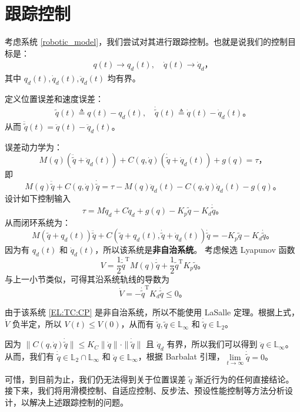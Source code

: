 \section{跟踪控制}\label{6Cref}

考虑系统 \eqref{robotic_model}，我们尝试对其进行跟踪控制。也就是说我们的控制目标是：
\begin{align*}
    q(t) \to q_d(t), \quad \dot{q}(t) \to \dot{q}_d \text{，}
\end{align*}
其中 $q_d(t), \dot{q}_d(t), \ddot{q}_d(t)$ 均有界。

定义位置误差和速度误差：
\begin{align*}
    \tilde{q}(t) \triangleq q(t) - q_d(t), \quad \dot{\tilde{q}}(t) \triangleq \dot{q}(t) - \dot{q}_d(t) \text{。}
\end{align*}
从而 $\ddot{\tilde{q}}(t) = \ddot{q}(t) - \ddot{q}_d(t)$。

误差动力学为：
\[
    M (q) (\ddot{\tilde{q}} + \ddot{q}_d(t)) + C (q, \dot{q}) (\dot{\tilde{q}} + \dot{q}_d(t)) + g(q) = \tau \text{，}
\]
即
\begin{equation}
    M (q) \ddot{\tilde{q}} + C (q, \dot{q}) \dot{\tilde{q}} = \tau - M(q) \ddot{q}_d(t) - C (q, \dot{q}) \dot{q}_d(t) - g(q) \text{。}
\end{equation}
设计如下控制输入
\[
    \tau = M \ddot{q}_d + C \dot{q}_d + g(q) - K_p \tilde{q} - K_d \dot{\tilde{q}} \text{。}
\]
从而闭环系统为：
\begin{equation} \label{EL:TC:CP}
    M (\tilde{q} + q_d (t)) \ddot{\tilde{q}} + C (\tilde{q} + q_d (t),
    \dot{\tilde{q}} + \dot{q}_d (t)) \dot{\tilde{q}} = - K_p \tilde{q} - K_d
    \dot{\tilde{q}} \text{。}
\end{equation}
因为有 $q_d(t)$ 和 $\dot{q}_d(t)$，所以该系统是\textbf{非自治系统}。
考虑候选 Lyapunov 函数
\[
    V = \frac{1}{2} \dot{\tilde{q}}^\mathrm{T} M(q) \dot{\tilde{q}} + \frac{1}{2} \tilde{q}^\mathrm{T} K_p \tilde{q} \text{。}
\]
与上一小节类似，可得其沿系统轨线的导数为
\[
    \dot{V} = - \dot{\tilde{q}}^\mathrm{T} K_d \dot{\tilde{q}} \leq 0 \text{。}
\]

由于该系统 \eqref{EL:TC:CP} 是非自治系统，所以不能使用 LaSalle 定理。根据上式，$\dot{V}$ 负半定，所以 $V(t) \leq V(0)$，从而有 $\dot{\tilde{q}}, \tilde{q} \in \mathbb{L}_\infty$ 和 $\dot{\tilde{q}} \in \mathbb{L}_2$。

因为 $\| C(q, \dot{q}) \dot{\tilde{q}} \| \leq K_C \| \dot{q} \| \cdot \| \dot{\tilde{q}} \|$ 且 $\dot{q}_d$ 有界，所以我们可以得到 $\ddot{q} \in \mathbb{L}_\infty$。从而，我们有 $\dot{\tilde{q}} \in \mathbb{L}_2 \cap \mathbb{L}_\infty$ 和 $\ddot{q} \in \mathbb{L}_\infty$，根据 Barbalat 引理，$\lim\limits_{t \to \infty} \dot{\tilde{q}} = 0$。

可惜，到目前为止，我们仍无法得到关于位置误差 $\tilde{q}$ 渐近行为的任何直接结论。接下来，我们将用滑模控制、自适应控制、反步法、预设性能控制等方法分析设计，以解决上述跟踪控制的问题。
